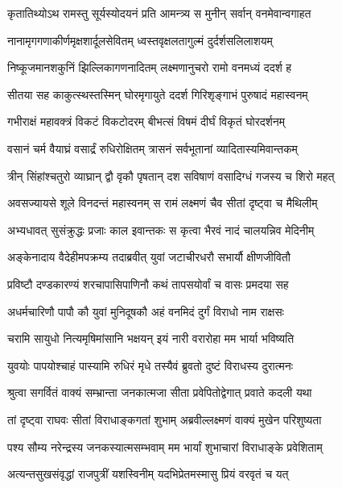 
\twolineshloka
{कृतातिथ्योऽथ रामस्तु सूर्यस्योदयनं प्रति}
{आमन्त्र्य स मुनीन् सर्वान् वनमेवान्वगाहत} %

\twolineshloka
{नानामृगगणाकीर्णमृक्षशार्दूलसेवितम्}
{ध्वस्तवृक्षलतागुल्मं दुर्दर्शसलिलाशयम्} %

\twolineshloka
{निष्कूजमानशकुनिं झिल्लिकागणनादितम्}
{लक्ष्मणानुचरो रामो वनमध्यं ददर्श ह} %

\twolineshloka
{सीतया सह काकुत्स्थस्तस्मिन् घोरमृगायुते}
{ददर्श गिरिशृङ्गाभं पुरुषादं महास्वनम्} %

\twolineshloka
{गभीराक्षं महावक्त्रं विकटं विकटोदरम्}
{बीभत्सं विषमं दीर्घं विकृतं घोरदर्शनम्} %

\twolineshloka
{वसानं चर्म वैयाघ्रं वसार्द्रं रुधिरोक्षितम्}
{त्रासनं सर्वभूतानां व्यादितास्यमिवान्तकम्} %

\twolineshloka
{त्रीन् सिंहांश्चतुरो व्याघ्रान् द्वौ वृकौ पृषतान् दश}
{सविषाणं वसादिग्धं गजस्य च शिरो महत्} %

\twolineshloka
{अवसज्यायसे शूले विनदन्तं महास्वनम्}
{स रामं लक्ष्मणं चैव सीतां दृष्ट्वा च मैथिलीम्} %

\onelineshloka
{अभ्यधावत् सुसंक्रुद्धः प्रजाः काल इवान्तकः स कृत्वा भैरवं नादं चालयन्निव मेदिनीम्} %

\twolineshloka
{अङ्केनादाय वैदेहीमपक्रम्य तदाब्रवीत्}
{युवां जटाचीरधरौ सभार्यौ क्षीणजीवितौ} %

\twolineshloka
{प्रविष्टौ दण्डकारण्यं शरचापासिपाणिनौ}
{कथं तापसयोर्वां च वासः प्रमदया सह} %

\twolineshloka
{अधर्मचारिणौ पापौ कौ युवां मुनिदूषकौ}
{अहं वनमिदं दुर्गं विराधो नाम राक्षसः} %

\twolineshloka
{चरामि सायुधो नित्यमृषिमांसानि भक्षयन्}
{इयं नारी वरारोहा मम भार्या भविष्यति} %

\twolineshloka
{युवयोः पापयोश्चाहं पास्यामि रुधिरं मृधे}
{तस्यैवं ब्रुवतो दुष्टं विराधस्य दुरात्मनः} %

\twolineshloka
{श्रुत्वा सगर्वितं वाक्यं सम्भ्रान्ता जनकात्मजा}
{सीता प्रवेपितोद्वेगात् प्रवाते कदली यथा} %

\twolineshloka
{तां दृष्ट्वा राघवः सीतां विराधाङ्कगतां शुभाम्}
{अब्रवील्लक्ष्मणं वाक्यं मुखेन परिशुष्यता} %

\twolineshloka
{पश्य सौम्य नरेन्द्रस्य जनकस्यात्मसम्भवाम्}
{मम भार्यां शुभाचारां विराधाङ्के प्रवेशिताम्} %

\twolineshloka
{अत्यन्तसुखसंवृद्धां राजपुत्रीं यशस्विनीम्}
{यदभिप्रेतमस्मासु प्रियं वरवृतं च यत्} %

